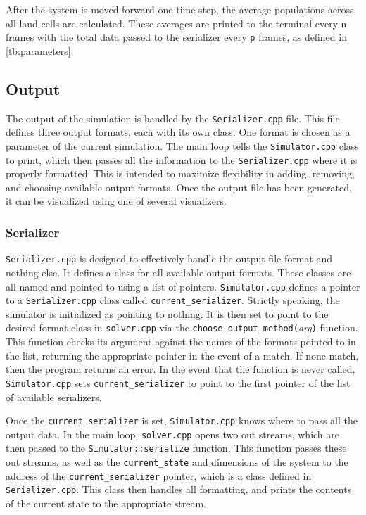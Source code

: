 \documentclass[a4paper,11pt]{article}
\begin{document}
After the system is moved forward one time step, the average populations across all land cells are calculated.  These averages are printed to the terminal every \texttt{n} frames with the total data passed to the serializer every \texttt{p} frames, as defined in \ref{tb:parameters}.

\subsection{Output}\label{output}

The output of the simulation is handled by the \texttt{Serializer.cpp} file.  This file defines three output formats, each with its own class.  One format is chosen as a parameter of the current simulation.  The main loop tells the \texttt{Simulator.cpp} class to print, which then passes all the information to the \texttt{Serializer.cpp} where it is properly formatted.   This is intended to maximize flexibility in adding, removing, and choosing available output formats.  Once the output file has been generated, it can be visualized using one of several visualizers.

\subsubsection{Serializer}

\texttt{Serializer.cpp} is designed to effectively handle the output file format and nothing else.  It defines a class for all available output formats.  These classes are all named and pointed to using a list of pointers.  \texttt{Simulator.cpp} defines a pointer to a \texttt{Serializer.cpp} class called \texttt{current\_serializer}.  Strictly speaking, the simulator is initialized as pointing to nothing.  It is then set to point to the desired format class in \texttt{solver.cpp} via the \texttt{choose\_output\_method(}\emph{arg}\texttt{)} function.  This function checks its argument against the names of the formats pointed to in the list, returning the appropriate pointer in the event of a match.  If none match, then the program returns an error.  In the event that the function is never called, \texttt{Simulator.cpp} sets \texttt{current\_serializer} to point to the first pointer of the list of available serializers.  

Once the  \texttt{current\_serializer} is set, \texttt{Simulator.cpp}  knows where to pass all the output data.  In the main loop, \texttt{solver.cpp}  opens two out streams, which are then passed to the \texttt{Simulator::serialize} function.  This function passes these out streams, as well as the \texttt{current\_state} and dimensions of the system to the address of the \texttt{current\_serializer} pointer, which is a class defined in \texttt{Serializer.cpp}.  This class then handles all formatting, and prints the contents of the current state to the appropriate stream.
\end{document}
